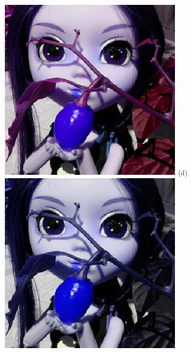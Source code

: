 \documentclass[	12pt, Times, openright, twoside, a4paper, english, brazil]{abntex2}
\begin{document}
\begin{figure}[!htb]
\centering
{\includegraphics[width=\linewidth]{figuraPimenta240.png}}
(d)
\endminipage\hfill
{}
\centering
{\includegraphics[width=\linewidth]{figuraPimenta240Protan.png}}

\end{figure}
\end{document}
